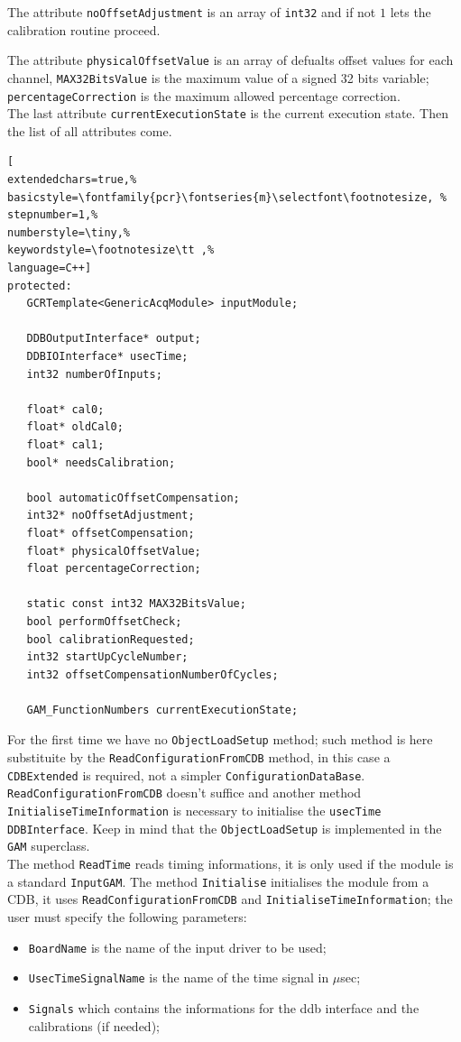 The attribute \texttt{noOffsetAdjustment} is an array of \texttt{int32} and if not $1$ lets the calibration routine proceed. 

The attribute \texttt{physicalOffsetValue} is an array of defualts offset values for each channel, \texttt{MAX32BitsValue} is the maximum value of a signed 32 bits variable; \texttt{percentageCorrection} is the maximum allowed percentage correction. \\

The last attribute \texttt{currentExecutionState} is the current execution state.
Then the list of all attributes come.

\begin{lstlisting}[
extendedchars=true,%
basicstyle=\fontfamily{pcr}\fontseries{m}\selectfont\footnotesize, %
stepnumber=1,%
numberstyle=\tiny,%
keywordstyle=\footnotesize\tt ,%
language=C++]
protected:  
   GCRTemplate<GenericAcqModule> inputModule;

   DDBOutputInterface* output;
   DDBIOInterface* usecTime;
   int32 numberOfInputs;

   float* cal0;
   float* oldCal0;
   float* cal1;
   bool* needsCalibration;

   bool automaticOffsetCompensation;
   int32* noOffsetAdjustment;
   float* offsetCompensation;
   float* physicalOffsetValue;
   float percentageCorrection;

   static const int32 MAX32BitsValue;
   bool performOffsetCheck;
   bool calibrationRequested;
   int32 startUpCycleNumber;
   int32 offsetCompensationNumberOfCycles;

   GAM_FunctionNumbers currentExecutionState;
\end{lstlisting}

For the first time we have no \texttt{ObjectLoadSetup} method; such method is here substituite by the \texttt{ReadConfigurationFromCDB} method, in this case a \texttt{CDBExtended} is required, not a simpler \texttt{ConfigurationDataBase}. \texttt{ReadConfigurationFromCDB} doesn't suffice and another method \texttt{InitialiseTimeInformation} is necessary to initialise the \texttt{usecTime} \texttt{DDBInterface}. Keep in mind that the \texttt{ObjectLoadSetup} is implemented in the \texttt{GAM} superclass. \\


The method \texttt{ReadTime} reads timing informations, it is only used if the module is a standard \texttt{InputGAM}. The method \texttt{Initialise} initialises the module from a CDB, it uses \texttt{ReadConfigurationFromCDB} and \texttt{InitialiseTimeInformation}; the user must specify the following parameters:
\begin{itemize}
 \item \texttt{BoardName} is the name of the input driver to be used;
 \item \texttt{UsecTimeSignalName} is the name of the time signal in $\mu$sec;
 \item \texttt{Signals} which contains the informations for the ddb interface and the calibrations (if needed);
\end{itemize}

